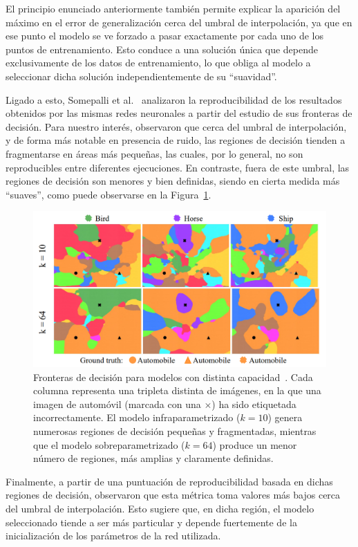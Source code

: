 El principio enunciado anteriormente también permite explicar la aparición del máximo en el error de generalización cerca del umbral de interpolación, ya que en ese punto el modelo se ve forzado a pasar exactamente por cada uno de los puntos de entrenamiento. Esto conduce a una solución única que depende exclusivamente de los datos de entrenamiento, lo que obliga al modelo a seleccionar dicha solución independientemente de su ``suavidad''.\newline

Ligado a esto, Somepalli et al.~\cite{Somepalli2022} analizaron la reproducibilidad de los resultados obtenidos por las mismas redes neuronales a partir del estudio de sus fronteras de decisión. Para nuestro interés, observaron que cerca del umbral de interpolación, y de forma más notable en presencia de ruido, las regiones de decisión tienden a fragmentarse en áreas más pequeñas, las cuales, por lo general, no son reproducibles entre diferentes ejecuciones. En contraste, fuera de este umbral, las regiones de decisión son menores y bien definidas, siendo en cierta medida más ``suaves'', como puede observarse en la Figura~\ref{fig:ground-truth-reproducibility}.\newline

\begin{figure}[h]
    \centering
    \includegraphics[width=0.6\linewidth]{img/ground-truth-reproducibility.png}
    \caption[Fronteras de decisión para modelos con distinta capacidad~\cite{Somepalli2022}.]{Fronteras de decisión para modelos con distinta capacidad~\cite{Somepalli2022}. Cada columna representa una tripleta distinta de imágenes, en la que una imagen de automóvil (marcada con una $\times$) ha sido etiquetada incorrectamente. El modelo infraparametrizado ($k=10$) genera numerosas regiones de decisión pequeñas y fragmentadas, mientras que el modelo sobreparametrizado ($k=64$) produce un menor número de regiones, más amplias y claramente definidas.}\label{fig:ground-truth-reproducibility}
\end{figure}

Finalmente, a partir de una puntuación de reproducibilidad basada en dichas regiones de decisión, observaron que esta métrica toma valores más bajos cerca del umbral de interpolación. Esto sugiere que, en dicha región, el modelo seleccionado tiende a ser más particular y depende fuertemente de la inicialización de los parámetros de la red utilizada.\newline

